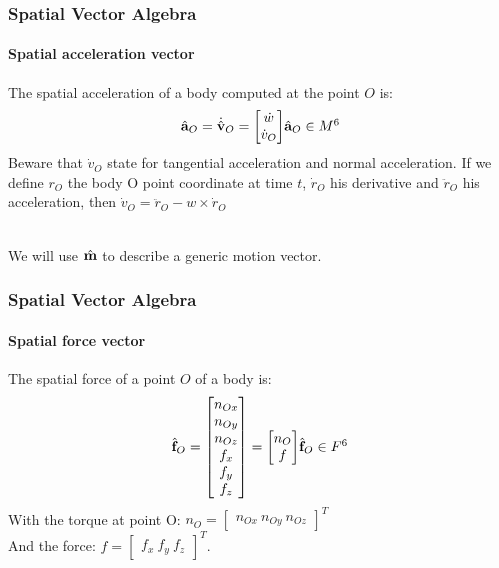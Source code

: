 \documentclass{beamer}
\begin{document}
\begin{frame}
\frametitle{Spatial Vector Algebra}
\framesubtitle{Spatial acceleration vector}
The spatial acceleration of a body computed at the point $ O $ is:
\begin{subequations}
	$$
	\accelvecHatOrigin{O} = \velocityvecDotHatOrigin{O} = \begin{bmatrix} \dot{w} \\ \dot{v}_O \end{bmatrix}
	$$
	$$
	\accelvecHatOrigin{O} \in \motionspace{6}
	$$
\end{subequations}
Beware that $ \dot{v}_O $ state for tangential acceleration and normal acceleration.
If we define $ r_O $ the body O point coordinate at time $ t $, $ \dot{r}_O $ his derivative and $ \ddot{r}_O $ his acceleration, then $ \dot{v}_O = \ddot{r}_O - w \times \dot{r}_O $ 

\hfill \\
We will use $ \hat{\mathbf{m}} $ to describe a generic motion vector.
\end{frame}


\begin{frame}
\frametitle{Spatial Vector Algebra}
\framesubtitle{Spatial force vector}
The spatial force of a point $ O $ of a body is:
\begin{subequations}
	$$
	\forcevecHatOrigin{O} = \begin{bmatrix} n_{Ox} \\ n_{Oy} \\ n_{Oz} \\ f_x \\ f_y \\ f_z \end{bmatrix} = \begin{bmatrix} n_O \\ f \end{bmatrix}
	$$
	$$
	\forcevecHatOrigin{O} \in \forcespace{6}
	$$
\end{subequations}
With the torque at point O:
$ n_O = \begin{bmatrix} n_{Ox}\ n_{Oy}\ n_{Oz} \end{bmatrix}^T $\\
			And the force:	
$ f = \begin{bmatrix} f_x\ f_y\ f_z \end{bmatrix}^T $.
\end{frame}
\end{document}
